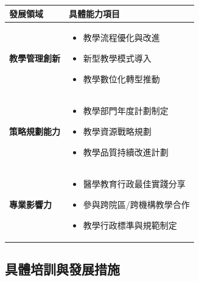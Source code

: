 \documentclass[12pt,a4paper]{article}
\begin{document}
\begin{longtable}{P{4cm}P{12cm}}
\toprule
\textbf{發展領域} & \textbf{具體能力項目} \\
\midrule
\endhead

\textbf{教學管理創新} &
\begin{itemize}[leftmargin=*,itemsep=1pt,parsep=0pt]
  \item 教學流程優化與改進
  \item 新型教學模式導入
  \item 教學數位化轉型推動
\end{itemize} \\
\midrule

\textbf{策略規劃能力} &
\begin{itemize}[leftmargin=*,itemsep=1pt,parsep=0pt]
  \item 教學部門年度計劃制定
  \item 教學資源戰略規劃
  \item 教學品質持續改進計劃
\end{itemize} \\
\midrule

\textbf{專業影響力} &
\begin{itemize}[leftmargin=*,itemsep=1pt,parsep=0pt]
  \item 醫學教育行政最佳實踐分享
  \item 參與跨院區/跨機構教學合作
  \item 教學行政標準與規範制定
\end{itemize} \\
\bottomrule

\end{longtable}

\subsection{具體培訓與發展措施}
\end{document}
